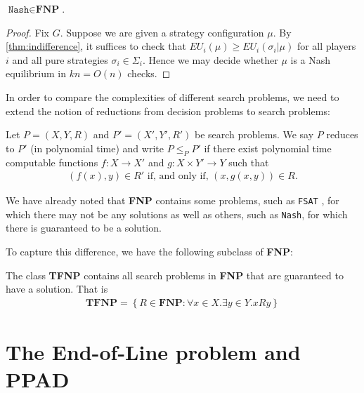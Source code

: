 \documentclass{article}
\begin{document}
\begin{corollary}
  $\texttt{Nash}\in\textbf{FNP}$.
  \begin{proof}
    Fix $G$. Suppose we are given a strategy configuration $\mu$.
    By \ref{thm:indifference}, it suffices to check that
    $EU_i(\mu) \geq EU_i(\sigma_i|\mu)$ for all players $i$ and all
    pure strategies $\sigma_i\in\Sigma_i$. Hence we may decide whether
    $\mu$ is a Nash equilibrium in $kn=O(n)$ checks.
  \end{proof}
\end{corollary}

In order to compare the complexities of different search problems,
we need to extend the notion of reductions from decision problems to
search problems:

\begin{definition}
  Let $P=(X,Y,R)$ and $P'=(X',Y',R')$ be search problems. We say
  $P$ reduces to $P'$ (in polynomial time) and write $P\leq_P P'$
  if there exist polynomial time computable functions $f:X\to X'$ and
  $g:X\times Y'\to Y$ such that
  \begin{align*}
    (f(x),y)\in R' \text{ if, and only if, } (x,g(x,y))\in R.
  \end{align*}
\end{definition}


We have already noted that \textbf{FNP} contains some problems,
such as \texttt{FSAT} , for which there may not be any solutions
as well as others, such as \texttt{Nash}, for which there is
guaranteed to be a solution.

To capture this difference, we have the following subclass
of \textbf{FNP}:

\begin{definition}
  The class \textbf{TFNP} contains all search problems in \textbf{FNP}
  that are guaranteed to have a solution. That is
  \begin{align*}
    \textbf{TFNP} = \left\lbrace{R \in \textbf{FNP} : \forall x\in X. \exists y\in Y. xRy}\right\rbrace
  \end{align*}
\end{definition}


\section{The End-of-Line problem and PPAD}
\end{document}
